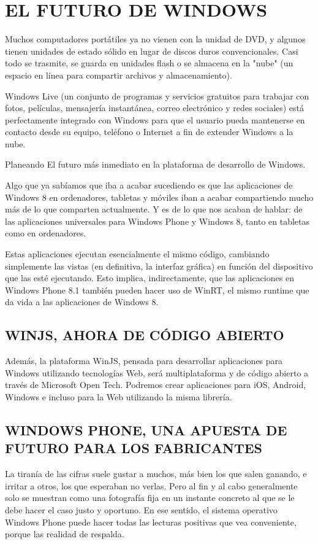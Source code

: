 \section*{EL FUTURO DE WINDOWS}
Muchos computadores portátiles ya no vienen con la unidad de DVD, y algunos tienen unidades de estado sólido en lugar de discos duros convencionales. Casi todo se trasmite, 
se guarda en unidades flash o se almacena en la "nube" (un espacio en línea para compartir archivos y almacenamiento).

Windows Live (un conjunto de programas y servicios gratuitos para trabajar con fotos, películas, mensajería instantánea, correo electrónico y redes sociales) está 
perfectamente integrado con Windows para que el usuario pueda mantenerse en contacto desde su equipo, teléfono o Internet a fin de extender Windows a la nube.

Planeando El futuro más inmediato en la plataforma de desarrollo de Windows.
 
Algo que ya sabíamos que iba a acabar sucediendo es que las aplicaciones de Windows 8 en ordenadores, tabletas y móviles iban a acabar compartiendo mucho más de lo que 
comparten actualmente. Y es de lo que nos acaban de hablar: de las aplicaciones universales para Windows Phone y Windows 8, tanto en tabletas como en ordenadores.

Estas aplicaciones ejecutan esencialmente el mismo código, cambiando simplemente las vistas (en definitiva, la interfaz gráfica) en función del dispositivo que las esté 
ejecutando. Esto implica, indirectamente, que las aplicaciones en Windows Phone 8.1 también pueden hacer uso de WinRT, el mismo runtime que da vida a las aplicaciones de 
Windows 8.

\subsection*{WINJS, AHORA DE CÓDIGO ABIERTO}
Además, la plataforma WinJS, pensada para desarrollar aplicaciones para Windows utilizando tecnologías Web, será multiplataforma y de código abierto a través de Microsoft 
Open Tech. Podremos crear aplicaciones para iOS, Android, Windows e incluso para la Web utilizando la misma librería.

\subsection*{WINDOWS PHONE, UNA APUESTA DE FUTURO PARA LOS FABRICANTES}
La tiranía de las cifras suele gustar a muchos, más bien los que salen ganando, e irritar a otros, los que esperaban no verlas. Pero al fin y al cabo generalmente solo se 
muestran como una fotografía fija en un instante concreto al que se le debe hacer el caso justo y oportuno. En ese sentido, el sistema operativo Windows Phone puede hacer 
todas las lecturas positivas que vea conveniente, porque las realidad de respalda.

